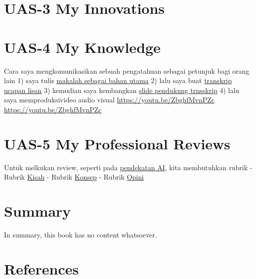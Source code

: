 \documentclass[
  letterpaper,
  DIV=11,
  numbers=noendperiod]{scrreprt}
\begin{document}

\chapter{UAS-3 My Innovations}\label{uas-3-my-innovations}


\chapter{UAS-4 My Knowledge}\label{uas-4-my-knowledge}

Cara saya mengkomunikasikan sebuah pengatahuan sebagai petunjuk bagi
orang lain 1) saya tulis
\href{Rekomendasi\%20Presentasi\%20Efektif(Contoh\%20Makalah).pdf}{makalah
sebagai bahan utama} 2) lalu saya buat
\href{Contoh\%20Transkrip\%20Presentasi.pdf}{transkrip ucapan lisan} 3)
kemudian saya kembangkan
\href{Rekomendasi\%20Presentasi\%20(Contoh\%20Slides).pdf}{slide
pendukung trnsskrip} 4) lalu saya memproduksivideo audio visual
\url{https://youtu.be/ZbghfMvnPZc} \url{https://youtu.be/ZbghfMvnPZc}


\chapter{UAS-5 My Professional
Reviews}\label{uas-5-my-professional-reviews}

Untuk melkukan review, seperti pada
\href{../My_Personal_Reviews/Doc.5.Mengevaluasi-Esai-Berdasarkan-Rubrik.pdf}{pendekatan
AI}, kita membutuhkan rubrik - Rubrik
\href{Dok.4.a.Rubrik_Kisah.pdf}{Kisah} - Rubrik
\href{Dok.4.b.Rubrik_Konsep.pdf}{Konsep} - Rubrik
\href{Dok.4.c.Rubrik_Opini.pdf}{Opini}


\chapter{Summary}\label{summary}

In summary, this book has no content whatsoever.


\chapter*{References}\label{references}


\label{refs}
\end{document}
